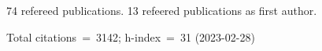 74 refereed publications. 13 refeered publications as first author.

Total citations~=~3142; h-index~=~31 (2023-02-28)